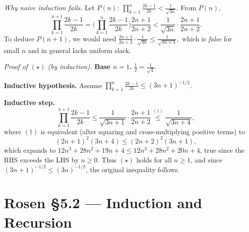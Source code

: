 \documentclass[11pt]{article}
\begin{document}
\begin{enumerate}[label=\textbf{\arabic*.}]
\textit{Why naive induction fails.} Let $P(n):\ \prod_{k=1}^{n}\frac{2k-1}{2k}<\frac1{\sqrt{3n}}$.
From $P(n)$,
\[
\prod_{k=1}^{n+1}\frac{2k-1}{2k}
=\Big(\prod_{k=1}^{n}\frac{2k-1}{2k}\Big)\frac{2n+1}{2n+2}
<\frac{1}{\sqrt{3n}}\cdot \frac{2n+1}{2n+2}.
\]
To deduce $P(n+1)$, we would need 
\(
\frac{2n+1}{2n+2}\cdot \frac1{\sqrt{3n}}\le \frac1{\sqrt{3n+3}},
\)
which is \emph{false} for small $n$ and in general lacks uniform slack.

\textit{Proof of $(\star)$ (by induction).}
\textbf{Base $n=1$.} $\frac12=\frac1{\sqrt{4}}$.

\textbf{Inductive hypothesis.} Assume $\prod_{k=1}^{n}\frac{2k-1}{2k}\le(3n+1)^{-1/2}$.

\textbf{Inductive step.}
\[
\prod_{k=1}^{n+1}\frac{2k-1}{2k}
\le \frac{1}{\sqrt{3n+1}}\cdot \frac{2n+1}{2n+2}
\stackrel{(\dagger)}{\le} \frac{1}{\sqrt{3n+4}},
\]
where $(\dagger)$ is equivalent (after squaring and cross-multiplying positive terms) to
\[
(2n+1)^2(3n+4)\le (2n+2)^2(3n+1),
\]
which expands to $12n^3+28n^2+19n+4 \le 12n^3+28n^2+20n+4$, true since the RHS exceeds the LHS by $n\ge0$.
Thus $(\star)$ holds for all $n\ge1$, and since $(3n+1)^{-1/2}\le (3n)^{-1/2}$, the original inequality follows. 

\end{enumerate}

\bigskip
\section*{Rosen §5.2 — Induction and Recursion}
\end{document}
